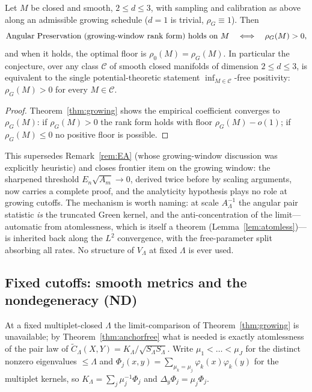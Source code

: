 \begin{corollary}\label{cor:equiv}
Let $M$ be closed and smooth, $2\le d\le3$, with sampling and calibration as above
along an admissible growing schedule ($d{=}1$ is trivial, $\rho_G\equiv1$).  Then
\[
\textup{Angular Preservation (growing-window rank form) holds on }M
\quad\Longleftrightarrow\quad \rho_G(M)>0,
\]
and when it holds, the optimal floor is $\rho_0(M)=\rho_G(M)$.  In particular the
conjecture, over any class $\mathcal C$ of smooth closed manifolds of dimension
$2\le d\le3$, is equivalent to the single potential-theoretic statement
$\inf_{M\in\mathcal C}$-free positivity: $\rho_G(M)>0$ for every $M\in\mathcal C$.
\end{corollary}

\begin{proof}
Theorem~\ref{thm:growing} shows the empirical coefficient converges to
$\rho_G(M)$: if $\rho_G(M)>0$ the rank form holds with floor $\rho_G(M)-o(1)$;
if $\rho_G(M)\le0$ no positive floor is possible.
\end{proof}

\begin{remark}
This supersedes Remark~\ref{rem:EA} (whose growing-window discussion was explicitly
heuristic) and closes frontier item on the growing window: the sharpened
threshold $E_n\sqrt{A_m}\to0$, derived twice before by scaling arguments, now
carries a complete proof, and the analyticity hypothesis plays no role at
growing cutoffs.  The mechanism is worth naming: at scale $A_\Lambda^{-1}$ the
angular pair statistic \emph{is} the truncated Green kernel, and the
anti-concentration of the limit---automatic from atomlessness, which is itself a
theorem (Lemma~\ref{lem:atomless})---is inherited back along the $L^2$
convergence, with the free-parameter split absorbing all rates.  No structure of
$V_\Lambda$ at fixed $\Lambda$ is ever used.
\end{remark}

\subsection{Fixed cutoffs: smooth metrics and the nondegeneracy (ND)}\label{ssec:smoothAC}

At a fixed multiplet-closed $\Lambda$ the limit-comparison of
Theorem~\ref{thm:growing} is unavailable; by Theorem~\ref{thm:anchorfree} what is
needed is exactly atomlessness of the pair law of
$\widetilde C_\Lambda(X,Y)=K_\Lambda/\sqrt{S_\Lambda S_\Lambda}$.  Write
$\mu_1<\dots<\mu_J$ for the distinct nonzero eigenvalues $\le\Lambda$ and
$\Phi_j(x,y)=\sum_{\mu_k=\mu_j}\varphi_k(x)\varphi_k(y)$ for the multiplet
kernels, so $K_\Lambda=\sum_j\mu_j^{-1}\Phi_j$ and
$\Delta_y\Phi_j=\mu_j\Phi_j$.

